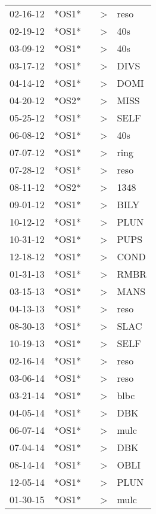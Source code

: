 \begin{supertabular}{lllll}
 02-16-12 &  *OS1* &   &  \textgreater &  reso \\
 02-19-12 &  *OS1* &   &  \textgreater &   40s \\
 03-09-12 &  *OS1* &   &  \textgreater &   40s \\
 03-17-12 &  *OS1* &   &  \textgreater &  DIVS \\
 04-14-12 &  *OS1* &   &  \textgreater &  DOMI \\
 04-20-12 &  *OS2* &   &  \textgreater &  MISS \\
 05-25-12 &  *OS1* &   &  \textgreater &  SELF \\
 06-08-12 &  *OS1* &   &  \textgreater &   40s \\
 07-07-12 &  *OS1* &   &  \textgreater &  ring \\
 07-28-12 &  *OS1* &   &  \textgreater &  reso \\
 08-11-12 &  *OS2* &   &  \textgreater &  1348 \\
 09-01-12 &  *OS1* &   &  \textgreater &  BILY \\
 10-12-12 &  *OS1* &   &  \textgreater &  PLUN \\
 10-31-12 &  *OS1* &   &  \textgreater &  PUPS \\
 12-18-12 &  *OS1* &   &  \textgreater &  COND \\
 01-31-13 &  *OS1* &   &  \textgreater &  RMBR \\
 03-15-13 &  *OS1* &   &  \textgreater &  MANS \\
 04-13-13 &  *OS1* &   &  \textgreater &  reso \\
 08-30-13 &  *OS1* &   &  \textgreater &  SLAC \\
 10-19-13 &  *OS1* &   &  \textgreater &  SELF \\
 02-16-14 &  *OS1* &   &  \textgreater &  reso \\
 03-06-14 &  *OS1* &   &  \textgreater &  reso \\
 03-21-14 &  *OS1* &   &  \textgreater &  blbc \\
 04-05-14 &  *OS1* &   &  \textgreater &   DBK \\
 06-07-14 &  *OS1* &   &  \textgreater &  mulc \\
 07-04-14 &  *OS1* &   &  \textgreater &   DBK \\
 08-14-14 &  *OS1* &   &  \textgreater &  OBLI \\
 12-05-14 &  *OS1* &   &  \textgreater &  PLUN \\
 01-30-15 &  *OS1* &   &  \textgreater &  mulc \\

\end{supertabular}
